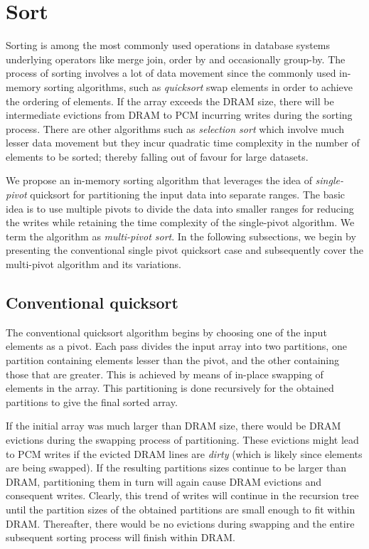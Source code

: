 \section{Sort}
\label{sort}

Sorting is among the most commonly used operations in database systems underlying operators like merge join, order by and occasionally group-by. The process of sorting involves a lot of data movement since the commonly used in-memory sorting algorithms, such as \textit{quicksort} swap elements in order to achieve the ordering of elements. If the array exceeds the DRAM size, there will be intermediate evictions from DRAM to PCM incurring writes during the sorting process. There are other algorithms such as \textit{selection sort} which involve much lesser data movement but they incur quadratic time complexity in the number of elements to be sorted; thereby falling out of favour for large datasets.

We propose an in-memory sorting algorithm that leverages the idea of \textit{single-pivot} quicksort for partitioning the input data into separate ranges. The basic idea is to use multiple pivots to divide the data into smaller ranges for reducing the writes while retaining the time complexity of the single-pivot algorithm. We term the algorithm as \textit{multi-pivot sort}. In the following subsections, we begin by presenting the conventional single pivot quicksort case and subsequently cover the multi-pivot algorithm and its variations.

\subsection{Conventional quicksort}
The conventional quicksort algorithm begins by choosing one of the input elements as a pivot. Each pass divides the input array into two partitions, one partition containing elements lesser than the pivot, and the other containing those that are greater. This is achieved by means of in-place swapping of elements in the array. This partitioning is done recursively for the obtained partitions to give the final sorted array.

If the initial array was much larger than DRAM size, there would be DRAM evictions during the swapping process of partitioning. These evictions might lead to PCM writes if the evicted DRAM lines are \textit{dirty} (which is likely since elements are being swapped). If the resulting partitions sizes continue to be larger than DRAM, partitioning them in turn will again cause DRAM evictions and consequent writes. Clearly, this trend of writes will continue in the recursion tree until the partition sizes of the obtained partitions are small enough to fit within DRAM. Thereafter, there would be no evictions during swapping and the entire subsequent sorting process will finish within DRAM.

